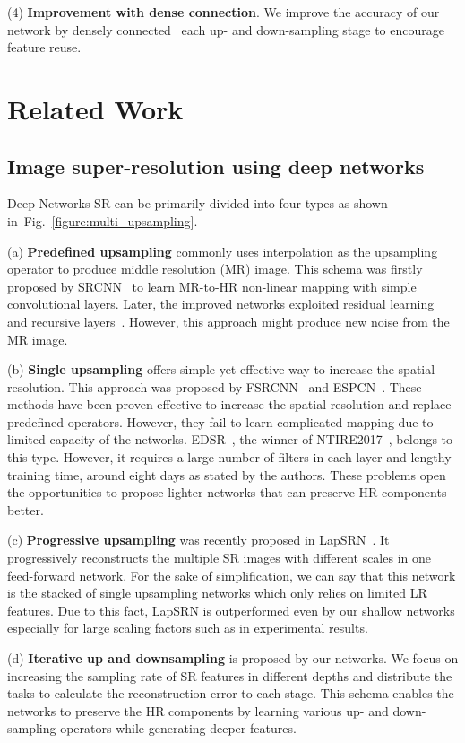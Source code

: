 \documentclass[10pt,twocolumn,letterpaper]{article}
\begin{document}
\noindent(4) \textbf{Improvement with dense connection}. We improve the accuracy of our network by densely connected~\cite{huang2017densely} each up- and down-sampling stage to encourage feature reuse.


\section{Related Work}
\subsection{Image super-resolution using deep networks}
Deep Networks SR can be primarily divided into four types as shown in~Fig.~\ref{figure:multi_upsampling}.

(a) \textbf{Predefined upsampling} commonly uses interpolation as the upsampling operator to produce middle resolution (MR) image. This schema was firstly proposed by SRCNN~\cite{dong2016image} to learn MR-to-HR non-linear mapping with simple convolutional layers. Later, the improved networks exploited residual learning~\cite{Kim_2016_VDSR,Tai-DRRN-2017} and recursive layers~\cite{kim2016deeply}. However, this approach might produce new noise from the MR image.


(b) \textbf{Single upsampling} offers simple yet effective way to increase the spatial resolution. This approach was proposed by FSRCNN~\cite{dong2016accelerating} and ESPCN~\cite{shi2016real}. 
These methods have been proven effective to increase the spatial resolution and replace predefined operators. However, they fail to learn complicated mapping due to limited capacity of the networks.
EDSR~\cite{Lim_2017_CVPR_Workshops}, the winner of NTIRE2017~\cite{timofte2017ntire}, belongs to this type. However, it
requires a large number of filters in each layer and lengthy training time, around eight days as stated by the authors. These problems open the opportunities to propose lighter networks that can preserve HR components better.

(c) \textbf{Progressive upsampling} was recently proposed in
LapSRN~\cite{LapSRN}. It progressively reconstructs the multiple SR
images with different scales in one feed-forward network. For the sake
of simplification, we can say that this network is the stacked of single upsampling networks which only relies on limited LR features. 
Due to this fact, LapSRN is outperformed even by our shallow networks especially for large scaling factors such as  in experimental results.


(d) \textbf{Iterative up and downsampling} is proposed by our networks. We focus on increasing the sampling rate of SR features in different depths and distribute the tasks to calculate the reconstruction error to each stage. This schema enables the networks to preserve the HR components by learning various up- and down-sampling operators while generating deeper features.
\end{document}
